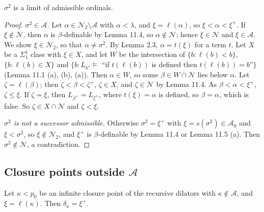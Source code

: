 \documentclass[11pt]{article}
\begin{document}
\begin{statement} $\sigma^2$ is a limit of admissible ordinals.
\end{statement}

\begin{proof} \emph{$\sigma^2 \in \mathcal A$.} Let $\alpha \in \mathcal N_2 \setminus \mathcal A$ with
$\alpha < \lambda$, and $\xi = \ell(\alpha)$, so $\xi < \alpha < \xi^+$. If $\xi \notin \mathcal N$, then $\alpha$ is
$\beta$-definable by Lemma 11.4, so $\alpha \notin \mathcal N$; hence $\xi \in \mathcal N$ and $\xi \in \mathcal A$.
We show $\xi \in \mathcal N_2$, so that $\alpha \ne \sigma^2$. By Lemma 2.3, $\alpha = t(\xi)$ for a term $t$. Let
$X$ be a $\Sigma^1_1$ class with $\xi \in X$, and let $W$ be the intersection of $\{b : \ell(b) < b\}$,
$\{b : \ell(b) \in X\}$ and $\{b : L_{b^+} \models$ ``if $t(\ell(b))$ is defined then $t(\ell(b)) = b$''$\}$
(Lemma 11.1 (a), (b), (a)). Then $\alpha \in W$, so some $\beta \in W \cap \mathcal N$ lies below $\alpha$. Let
$\zeta = \ell(\beta)$; then $\zeta < \beta < \zeta^+$, $\zeta \in X$, and $\zeta \in \mathcal N$ by Lemma 11.4. As
$\beta < \alpha < \xi^+$, $\zeta \le \xi$. If $\zeta = \xi$, then $L_{\beta^+} = L_{\xi^+}$, where $t(\xi) = \alpha$
is defined, so $\beta = \alpha$, which is false. So $\zeta \in X \cap \mathcal N$ and $\zeta < \xi$.

\emph{$\sigma^2$ is not a successor admissible.} Otherwise $\sigma^2 = \xi^+$ with $\xi = s(\sigma^2) \in
\mathcal A_0$ and $\xi < \sigma^2$, so $\xi \notin \mathcal N_2$, and $\xi^+$ is $\beta$-definable by Lemma 11.4 or
Lemma 11.5 (a). Then $\sigma^2 \notin \mathcal N$, a contradiction.
\end{proof}

\subsection{Closure points outside \texorpdfstring{$\mathcal A$}{A}}

\begin{statement} Let $\kappa < p_0$ be an infinite closure point of the recursive dilators
with $\kappa \notin \mathcal A$, and $\xi = \ell(\kappa)$. Then $\delta_{\kappa} = \xi^+$.
\end{statement}
\end{document}
